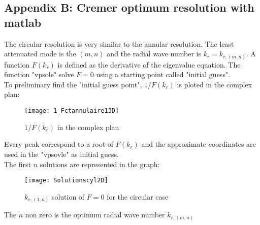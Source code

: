 \subsection*{Appendix B: Cremer optimum resolution with matlab}\label{sec:AppendixB}
The circular resolution is very similar to the annular resolution.
The least attenuated mode is the $(m,n)$ and the radial wave number is $k_r=k_{r,(m,n)}$. A function $F(k_r)$ is defined as the derivative of the eigenvalue equation. The function "vpsole" solve $F=0$ using a starting point called "initial guess". \\
To preliminary find the "initial guess point", $1/F(k_r)$ is ploted in the complex plan: 
\begin{figure}[H] \centering
    \texttt{[image: 1\_Fctannulaire13D]}
    \caption{$1/F(k_r)$ in the complex plan}
\end{figure}
Every peak correspond to a root of $F(k_r)$ and the approximate coordinates are used in the "vpsovle" as initial guess.\\
The first $n$ solutions are represented in the graph:
\begin{figure}[H] \centering
    \texttt{[image: Solutionscyl2D]}
    \caption{$k_{r,(1,n)}$ solution of $F=0$ for the circular case}
\end{figure}
The $n$ non zero is the optimum radial wave number $k_{r,(m,n)}$ 
